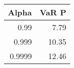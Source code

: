 \begin{tabular}{rr}
\toprule
 Alpha &  VaR P \\
\midrule
  0.99 &   7.79 \\
  0.999 &  10.35 \\
  0.9999 &  12.46 \\
\bottomrule
\end{tabular}
